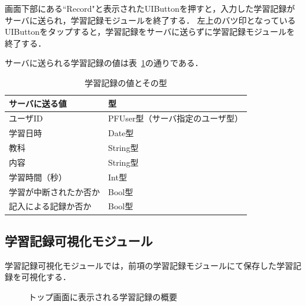 画面下部にある``Record"と表示されたUIButtonを押すと，入力した学習記録がサーバに送られ，学習記録モジュールを終了する．
左上のバツ印となっているUIButtonをタップすると，学習記録をサーバに送らずに学習記録モジュールを終了する．

サーバに送られる学習記録の値は表~\ref{tb:study_record}の通りである．

\begin{table}[htb]
\begin{center}
  \begin{tabular}{|l|l|} \hline
    サーバに送る値 & 型 \\ \hline
    ユーザID & PFUser型（サーバ指定のユーザ型） \\
    学習日時 & Date型 \\
    教科 & String型 \\ 
    内容 & String型 \\ 
	学習時間（秒） & Int型 \\ 
	学習が中断されたか否か & Bool型 \\ 
	記入による記録か否か & Bool型 \\  \hline
  \end{tabular}
  \caption{学習記録の値とその型}
  \label{tb:study_record}
\end{center}
\end{table}

\subsection{学習記録可視化モジュール}
学習記録可視化モジュールでは，前項の学習記録モジュールにて保存した学習記録を可視化する．

\begin{figure}[ht]
	\begin{center}
	\caption{トップ画面に表示される学習記録の概要}
	\label{fig:outline}
	\end{center}
\end{figure}

